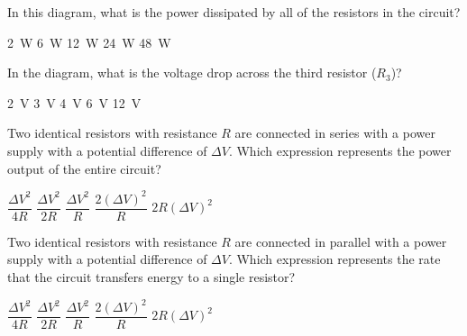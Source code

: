 \documentclass{../../../oss-classkick-exam}
\begin{document}
\begin{multicols*}{2}
\begin{questions}
    \question In this diagram, what is the power dissipated by all of the
    resistors in the circuit?
    \begin{choices}
      \choice\SI{2}{W}
      \choice\SI{6}{W}
      \choice\SI{12}{W}
      \choice\SI{24}{W}
      \choice\SI{48}{W}
    \end{choices}
  
    \question In the diagram, what is the voltage drop across the third resistor
    ($R_3$)?
    \begin{choices}
      \choice\SI{2}{V}
      \choice\SI{3}{V}
      \choice\SI{4}{V}
      \choice\SI{6}{V}
      \choice\SI{12}{V}
    \end{choices}
    \label{series4}
    \columnbreak
    
    \question Two identical resistors with resistance $R$ are connected in
    series with a power supply with a potential difference of $\Delta V$. Which
    expression represents the power output of the entire circuit?
    \begin{choices}
      \choice $\dfrac{\Delta V^2}{4R}$
      \choice $\dfrac{\Delta V^2}{2R}$
      \choice $\dfrac{\Delta V^2}{R}$
      \choice $\dfrac{2(\Delta V)^2}{R}$
      \choice $2R(\Delta V)^2$
    \end{choices}

    \question Two identical resistors with resistance $R$ are connected in
    parallel with a power supply with a potential difference of $\Delta V$.
    Which expression represents the rate that the circuit transfers energy to a
    single resistor?
    \begin{choices}
      \choice $\dfrac{\Delta V^2}{4R}$
      \choice $\dfrac{\Delta V^2}{2R}$
      \choice $\dfrac{\Delta V^2}{R}$
      \choice $\dfrac{2(\Delta V)^2}{R}$
      \choice $2R(\Delta V)^2$
    \end{choices}

\end{questions}
\end{multicols*}
\end{document}
